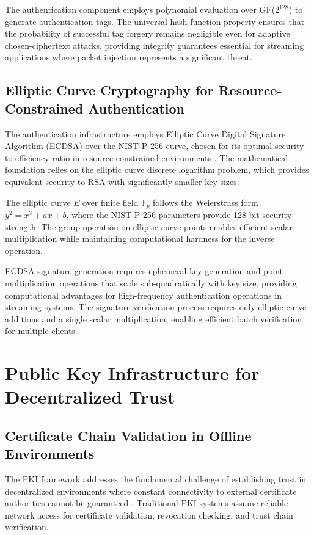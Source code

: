 The authentication component employs polynomial evaluation over GF($2^{128}$) to generate authentication tags. The universal hash function property ensures that the probability of successful tag forgery remains negligible even for adaptive chosen-ciphertext attacks, providing integrity guarantees essential for streaming applications where packet injection represents a significant threat.

\subsection{Elliptic Curve Cryptography for Resource-Constrained Authentication}

The authentication infrastructure employs Elliptic Curve Digital Signature Algorithm (ECDSA) over the NIST P-256 curve, chosen for its optimal security-to-efficiency ratio in resource-constrained environments \cite{johnson2001elliptic}. The mathematical foundation relies on the elliptic curve discrete logarithm problem, which provides equivalent security to RSA with significantly smaller key sizes.

The elliptic curve $E$ over finite field $\mathbb{F}_p$ follows the Weierstrass form $y^2 = x^3 + ax + b$, where the NIST P-256 parameters provide 128-bit security strength. The group operation on elliptic curve points enables efficient scalar multiplication while maintaining computational hardness for the inverse operation.

ECDSA signature generation requires ephemeral key generation and point multiplication operations that scale sub-quadratically with key size, providing computational advantages for high-frequency authentication operations in streaming systems. The signature verification process requires only elliptic curve additions and a single scalar multiplication, enabling efficient batch verification for multiple clients.

\section{Public Key Infrastructure for Decentralized Trust}

\subsection{Certificate Chain Validation in Offline Environments}

The PKI framework addresses the fundamental challenge of establishing trust in decentralized environments where constant connectivity to external certificate authorities cannot be guaranteed \cite{housley2002internet}. Traditional PKI systems assume reliable network access for certificate validation, revocation checking, and trust chain verification.


